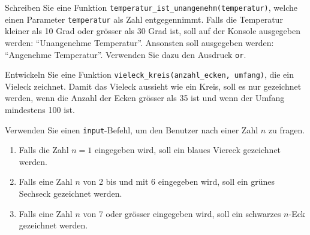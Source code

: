 \begin{myexercise}\label{ex:tempUnangenehm}
	Schreiben Sie eine Funktion \lstinline|temperatur_ist_unangenehm(temperatur)|, welche einen Parameter \lstinline|temperatur| als Zahl entgegennimmt. Falls die Temperatur kleiner als 10 Grad oder grösser als 30 Grad ist, soll auf der Konsole ausgegeben werden: \enquote{Unangenehme Temperatur}. Ansonsten soll ausgegeben werden: \enquote{Angenehme Temperatur}. Verwenden Sie dazu den Ausdruck \lstinline|or|.

	\begin{myanswer}
		
	\end{myanswer}
\end{myexercise}

\begin{myexercise}
	Entwickeln Sie eine Funktion \lstinline|vieleck_kreis(anzahl_ecken, umfang)|, die ein Vieleck zeichnet. Damit das Vieleck aussieht wie ein Kreis, soll es nur gezeichnet werden, wenn die Anzahl der Ecken grösser als 35 ist und wenn der Umfang mindestens 100 ist.
	\begin{myanswer}
		
	\end{myanswer}
\end{myexercise}

\begin{myexercise}
	Verwenden Sie einen \lstinline|input|-Befehl, um den Benutzer nach einer Zahl $n$ zu fragen.
	\begin{enumerate}
		\item Falls die Zahl $n = 1$ eingegeben wird, soll ein blaues Viereck gezeichnet werden.
		\item Falls eine Zahl $n$ von 2 bis und mit 6 eingegeben wird, soll ein grünes Sechseck gezeichnet werden.
		\item Falls eine Zahl $n$ von 7 oder grösser eingegeben wird, soll ein schwarzes $n$-Eck gezeichnet werden.
	\end{enumerate}
	\begin{myanswer}
		
	\end{myanswer}
\end{myexercise}

